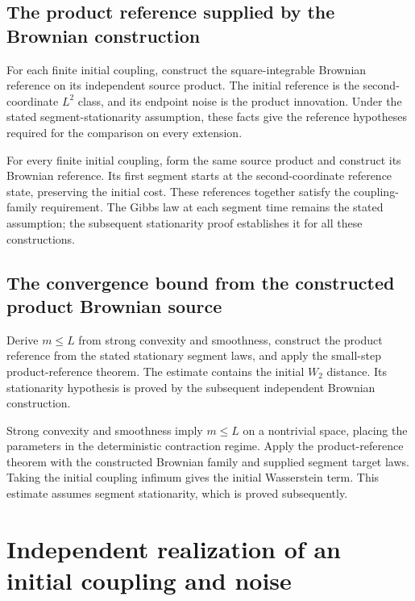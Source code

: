 \documentclass[11pt,a4paper]{article}
\begin{document}
\subsection{\texorpdfstring{The product reference supplied by the Brownian construction}{The product reference supplied by the Brownian construction}}


For each finite initial coupling, construct the square-integrable Brownian reference on its independent source product. The initial reference is the second-coordinate \(L^2\) class, and its endpoint noise is the product innovation. Under the stated segment-stationarity assumption, these facts give the reference hypotheses required for the comparison on every extension.



For every finite initial coupling, form the same source product and construct its Brownian reference. Its first segment starts at the second-coordinate reference state, preserving the initial cost. These references together satisfy the coupling-family requirement. The Gibbs law at each segment time remains the stated assumption; the subsequent stationarity proof establishes it for all these constructions.


\subsection{\texorpdfstring{The convergence bound from the constructed product Brownian source}{The convergence bound from the constructed product Brownian source}}


Derive \(m\le L\) from strong convexity and smoothness, construct the product reference from the stated stationary segment laws, and apply the small-step product-reference theorem. The estimate contains the initial \(W_2\) distance. Its stationarity hypothesis is proved by the subsequent independent Brownian construction.



Strong convexity and smoothness imply \(m\le L\) on a nontrivial space, placing the parameters in the deterministic contraction regime. Apply the product-reference theorem with the constructed Brownian family and supplied segment target laws. Taking the initial coupling infimum gives the initial Wasserstein term. This estimate assumes segment stationarity, which is proved subsequently.


\section{\texorpdfstring{Independent realization of an initial coupling and noise}{Independent realization of an initial coupling and noise}}
\end{document}
